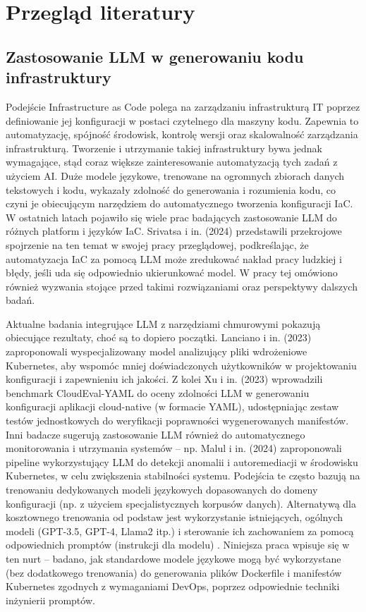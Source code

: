 \clearpage %
\section{Przegląd literatury}

\subsection{Zastosowanie LLM w generowaniu kodu infrastruktury}

Podejście Infrastructure as Code polega na zarządzaniu infrastrukturą IT poprzez definiowanie jej konfiguracji w postaci czytelnego dla maszyny kodu. Zapewnia to automatyzację, spójność środowisk, kontrolę wersji oraz skalowalność zarządzania infrastrukturą. Tworzenie i utrzymanie takiej infrastruktury bywa jednak wymagające, stąd coraz większe zainteresowanie automatyzacją tych zadań z użyciem AI. Duże modele językowe, trenowane na ogromnych zbiorach danych tekstowych i kodu, wykazały zdolność do generowania i rozumienia kodu, co czyni je obiecującym narzędziem do automatycznego tworzenia konfiguracji IaC. W ostatnich latach pojawiło się wiele prac badających zastosowanie LLM do różnych platform i języków IaC. Srivatsa i in. (2024) \cite{srivatsa_survey_2024} przedstawili przekrojowe spojrzenie na ten temat w swojej pracy przeglądowej, podkreślając, że automatyzacja IaC za pomocą LLM może zredukować nakład pracy ludzkiej i błędy, jeśli uda się odpowiednio ukierunkować model. W pracy tej omówiono również wyzwania stojące przed takimi rozwiązaniami oraz perspektywy dalszych badań.

Aktualne badania integrujące LLM z narzędziami chmurowymi pokazują obiecujące rezultaty, choć są to dopiero początki. Lanciano i in. (2023) \cite{lanciano_analyzing_2023} zaproponowali wyspecjalizowany model analizujący pliki wdrożeniowe Kubernetes, aby wspomóc mniej doświadczonych użytkowników w projektowaniu konfiguracji i zapewnieniu ich jakości. Z kolei Xu i in. (2023) \cite{xu_cloudeval-yaml_2023} wprowadzili benchmark CloudEval-YAML do oceny zdolności LLM w generowaniu konfiguracji aplikacji cloud-native (w formacie YAML), udostępniając zestaw testów jednostkowych do weryfikacji poprawności wygenerowanych manifestów. Inni badacze sugerują zastosowanie LLM również do automatycznego monitorowania i utrzymania systemów – np. Malul i in. (2024) \cite{malul_genkubesec_2024} zaproponowali pipeline wykorzystujący LLM do detekcji anomalii i autoremediacji w środowisku Kubernetes, w celu zwiększenia stabilności systemu. Podejścia te często bazują na trenowaniu dedykowanych modeli językowych dopasowanych do domeny konfiguracji (np. z użyciem specjalistycznych korpusów danych). Alternatywą dla kosztownego trenowania od podstaw jest wykorzystanie istniejących, ogólnych modeli (GPT-3.5, GPT-4, Llama2 itp.) i sterowanie ich zachowaniem za pomocą odpowiednich promptów \cite{liu_pre-train_2023} (instrukcji dla modelu) \cite{kratzke_dont_2024}. Niniejsza praca wpisuje się w ten nurt – badano, jak standardowe modele językowe mogą być wykorzystane (bez dodatkowego trenowania) do generowania plików Dockerfile i manifestów Kubernetes zgodnych z wymaganiami DevOps, poprzez odpowiednie techniki inżynierii promptów.

